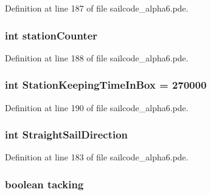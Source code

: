 \-Definition at line 187 of file sailcode\-\_\-alpha6.\-pde.

\hypertarget{group__group1_gaffc96d075c8796c3d5ef3dc5824c0819}{
\subsubsection[{station\-Counter}]{\setlength{\rightskip}{0pt plus 5cm}int {\bf station\-Counter}}}
\label{group__group1_gaffc96d075c8796c3d5ef3dc5824c0819}


\-Definition at line 188 of file sailcode\-\_\-alpha6.\-pde.

\hypertarget{group__group1_gabe157ddfb46568e2de8b041f54ac6d98}{
\subsubsection[{\-Station\-Keeping\-Time\-In\-Box}]{\setlength{\rightskip}{0pt plus 5cm}int {\bf \-Station\-Keeping\-Time\-In\-Box} = 270000}}
\label{group__group1_gabe157ddfb46568e2de8b041f54ac6d98}


\-Definition at line 190 of file sailcode\-\_\-alpha6.\-pde.

\hypertarget{group__group1_gac9d865c1411ae815f6b2394c45d604e7}{
\subsubsection[{\-Straight\-Sail\-Direction}]{\setlength{\rightskip}{0pt plus 5cm}int {\bf \-Straight\-Sail\-Direction}}}
\label{group__group1_gac9d865c1411ae815f6b2394c45d604e7}


\-Definition at line 183 of file sailcode\-\_\-alpha6.\-pde.

\hypertarget{group__group1_gab23a7a79ede8d141fa92f4475d36fb24}{
\subsubsection[{tacking}]{\setlength{\rightskip}{0pt plus 5cm}boolean {\bf tacking}}}
\label{group__group1_gab23a7a79ede8d141fa92f4475d36fb24}


